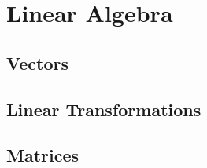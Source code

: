 \chapter{Linear Algebra}

\section{Vectors}







%
%
%
%

\section{Linear Transformations}



\section{Matrices}










